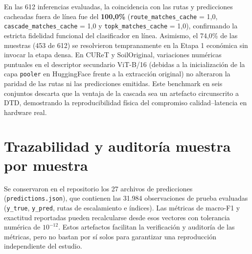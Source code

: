 En las 612 inferencias evaluadas, la coincidencia con las rutas y predicciones cacheadas fuera de línea fue del \textbf{100{,}0\%} (\texttt{route\_matches\_cache} = 1{,}0, \texttt{cascade\_matches\_cache} = 1{,}0 y \texttt{topk\_matches\_cache} = 1{,}0), confirmando la estricta fidelidad funcional del clasificador en línea. Asimismo, el 74{,}0\% de las muestras (453 de 612) se resolvieron tempranamente en la Etapa 1 económica sin invocar la etapa densa. En CUReT y SoilOriginal, variaciones numéricas puntuales en el descriptor secundario ViT-B/16 (debidas a la inicialización de la capa \texttt{pooler} en HuggingFace frente a la extracción original) no alteraron la paridad de las rutas ni las predicciones emitidas. Este benchmark en seis conjuntos descarta que la ventaja de la cascada sea un artefacto circunscrito a DTD, demostrando la reproducibilidad física del compromiso calidad--latencia en hardware real.

\section{Trazabilidad y auditoría muestra por muestra}\label{sec:trazabilidad}

Se conservaron en el repositorio los 27 archivos de predicciones (\texttt{predictions.json}), que contienen las 31.984 observaciones de prueba evaluadas (\texttt{y\_true}, \texttt{y\_pred}, rutas de escalamiento e índices). Las métricas de macro-F1 y exactitud reportadas pueden recalcularse desde esos vectores con tolerancia numérica de $10^{-12}$. Estos artefactos facilitan la verificación y auditoría de las métricas, pero no bastan por sí solos para garantizar una reproducción independiente del estudio.
